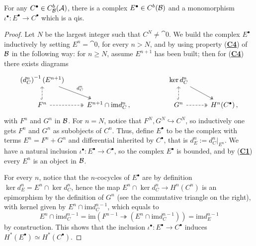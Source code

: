 \begin{lemma}\label{equivalence-bounded-coh}
	For any $C^{\bullet} \in C^{b}_{\mathcal{B}}(\mathcal{A})$,
	there is a complex $E^{\bullet} \in C^{b}(\mathcal{B})$
	and a monomorphism $\iota^{\bullet} : E^{\bullet} \to C^{\bullet}$
	which is a qis.
	\begin{proof}
		Let $N$ be the largest integer such that $C^{N} \ne \cat{0}$.
		We build the complex $E^{\bullet}$ inductively
		by setting $E^{n}=\cat{0}$, for every $n > N$, 
		and by using property (\hyperref[C4]{\textbf{C4}}) of $\mathcal{B}$ in the following way:
		for $n \ge N$, assume $E^{n+1}$ has been built; then for (\hyperref[C4]{\textbf{C4}})
		there exists diagrams
		\begin{equation*}
			\begin{tikzcd}
				\left( d_{C}^{n} \right)^{-1}(E^{n+1}) \ar[dr, "d_{C}^{n}", two heads] & & &
				\ker d^{n}_{C} \ar[dr, two heads] & \\
				F^{n} \ar[u, hook, dashed] \ar[r, dashed, two heads] & E^{n+1} \cap \mathrm{im}d_{C}^{n}\,,
				& & G^{n} \ar[r, dashed, two heads] \ar[u, hook, dashed] & H^{n}(C^{\bullet})\,,
			\end{tikzcd}
		\end{equation*}
		with $F^{n}$ and $G^{n}$ in $\mathcal{B}$. For $n=N$, notice that
		$F^{N}, G^{N} \hookrightarrow C^{N}$, so inductively one gets $F^{n}$ and $G^{n}$
		as subobjects of $C^{n}$. Thus, define $E^{\bullet}$ to be the complex with terms
		$E^{n} = F^{n} + G^{n}$ and differential inherited by $C^{\bullet}$, 
		that is $d_{E}^{n} := d_{C}^{n}\vert_{E^{n}}$.
		We have a natural inclusion $\iota^{\bullet}:E^{\bullet} \to C^{\bullet}$,
		so the complex $E^{\bullet}$ is %
		bounded, and by (\hyperref[C1]{\textbf{C1}}) every $E^{n}$ is an object in $\mathcal{B}$.
		
		For every $n$, notice that the $n$-cocycles of $E^{\bullet}$ are
		by definition $\ker d_{E}^{n} = E^{n} \cap \ker d_{C}^{n}$,
		hence the map $E^{n} \cap \ker d_{C}^{n} \to H^{n}(C^{n})$ is an epimorphism
		by the definition of $G^{n}$ (see the commutative triangle on the right),
		with kernel given by $E^{n} \cap \mathrm{im}d_{C}^{n-1}$, 
		which equals to
		\begin{equation*}
			E^{n} \cap \mathrm{im}d_{C}^{n-1} 
			= \mathrm{im}\left(F^{n-1} \twoheadrightarrow (E^{n} \cap \mathrm{im}d_{C}^{n-1}) \right)
			= \mathrm{im} d_{E}^{n-1}
		\end{equation*}
		by construction. This shows that the inclusion $\iota^{\bullet}:E^{\bullet} \to C^{\bullet}$
		induces %
		$H^{*}(E^{\bullet}) \simeq H^{*}(C^{\bullet})$.
	\end{proof}
\end{lemma}

